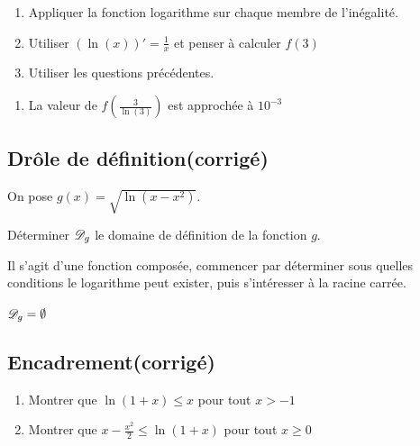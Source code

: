 \documentclass[oneside,12pt]{book}          %
\begin{document}
\begin{hint}
	\begin{enumerate}
		\item Appliquer la fonction logarithme sur chaque membre de l'inégalité.
		\item Utiliser $\left(\ln(x)\right)'=\frac{1}{x}$ et penser à calculer $f(3)$
		\item[4.] Utiliser les questions précédentes.
	\end{enumerate}
\end{hint}
\begin{sol}
	\begin{enumerate}
		\item[2.] La valeur de $f\left(\frac{3}{\ln(3)}\right)$ est approchée à $10^{-3}$\\
	\end{enumerate}
\end{sol}



\subsection{Drôle de définition\quad\small{(corrigé)}}
On pose $g(x)=\sqrt{\ln(x-x^2)}$.

Déterminer ${\mathscr{D}}_g$ le domaine de définition de la fonction $g$.

\begin{hint}
	Il s'agit d'une fonction composée, commencer par déterminer sous quelles conditions le logarithme peut exister, puis s'intéresser à la racine carrée.
\end{hint}
\begin{sol}
	${\mathscr{D}}_g=\emptyset$
\end{sol}



\subsection{Encadrement\quad\small{(corrigé)}}
\begin{enumerate}
    \item Montrer que $\ln(1+x)\leq x$ pour tout $x>-1$
    \item Montrer que $x-\frac{x^2}{2}\leq \ln(1+x)$ pour tout $x\geq0$
\end{enumerate}
\end{document}
